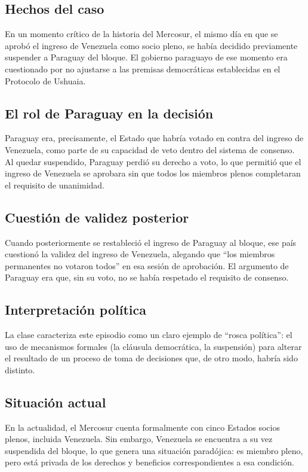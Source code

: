 \documentclass[12pt,oneside]{book}
\begin{document}
\subsection{Hechos del caso}

En un momento crítico de la historia del Mercosur, el mismo día en que se aprobó el ingreso de Venezuela como socio pleno, se había decidido previamente suspender a Paraguay del bloque. El gobierno paraguayo de ese momento era cuestionado por no ajustarse a las premisas democráticas establecidas en el Protocolo de Ushuaia.

\subsection{El rol de Paraguay en la decisión}

Paraguay era, precisamente, el Estado que habría votado en contra del ingreso de Venezuela, como parte de su capacidad de veto dentro del sistema de consenso. Al quedar suspendido, Paraguay perdió su derecho a voto, lo que permitió que el ingreso de Venezuela se aprobara sin que todos los miembros plenos completaran el requisito de unanimidad.

\subsection{Cuestión de validez posterior}

Cuando posteriormente se restableció el ingreso de Paraguay al bloque, ese país cuestionó la validez del ingreso de Venezuela, alegando que ``los miembros permanentes no votaron todos'' en esa sesión de aprobación. El argumento de Paraguay era que, sin su voto, no se había respetado el requisito de consenso.

\subsection{Interpretación política}

La clase caracteriza este episodio como un claro ejemplo de ``rosca política'': el uso de mecanismos formales (la cláusula democrática, la suspensión) para alterar el resultado de un proceso de toma de decisiones que, de otro modo, habría sido distinto.

\subsection{Situación actual}

En la actualidad, el Mercosur cuenta formalmente con cinco Estados socios plenos, incluida Venezuela. Sin embargo, Venezuela se encuentra a su vez suspendida del bloque, lo que genera una situación paradójica: es miembro pleno, pero está privada de los derechos y beneficios correspondientes a esa condición.
\end{document}

